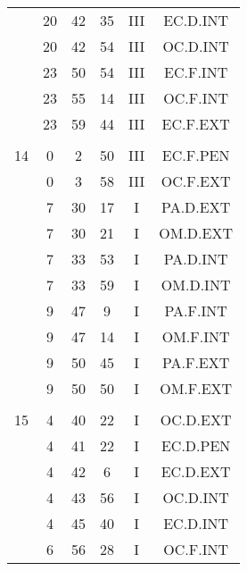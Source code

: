 \documentclass[12pt, a4paper]{article}
\begin{document}
\begin{multicols}{3}
{\begin{tabular}{c c c c c c}
	 	 	 	 & 20 & 42 & 35 & III & EC.D.INT\\%
	 	 	 	 & 20 & 42 & 54 & III & OC.D.INT\\%
	 	 	 	 & 23 & 50 & 54 & III & EC.F.INT\\%
	 	 	 	 & 23 & 55 & 14 & III & OC.F.INT\\%
	 	 	 	 & 23 & 59 & 44 & III & EC.F.EXT\\%
	 	 	 	 & & & & & \\%
	 	 	 	14 & 0 & 2 & 50 & III & EC.F.PEN\\%
	 	 	 	 & 0 & 3 & 58 & III & OC.F.EXT\\%
	 	 	 	 & 7 & 30 & 17 & I & PA.D.EXT\\%
	 	 	 	 & 7 & 30 & 21 & I & OM.D.EXT\\%
	 	 	 	 & 7 & 33 & 53 & I & PA.D.INT\\%
	 	 	 	 & 7 & 33 & 59 & I & OM.D.INT\\%
	 	 	 	 & 9 & 47 & 9 & I & PA.F.INT\\%
	 	 	 	 & 9 & 47 & 14 & I & OM.F.INT\\%
	 	 	 	 & 9 & 50 & 45 & I & PA.F.EXT\\%
	 	 	 	 & 9 & 50 & 50 & I & OM.F.EXT\\%
	 	 	 	 & & & & & \\%
	 	 	 	15 & 4 & 40 & 22 & I & OC.D.EXT\\%
	 	 	 	 & 4 & 41 & 22 & I & EC.D.PEN\\%
	 	 	 	 & 4 & 42 & 6 & I & EC.D.EXT\\%
	 	 	 	 & 4 & 43 & 56 & I & OC.D.INT\\%
	 	 	 	 & 4 & 45 & 40 & I & EC.D.INT\\%
	 	 	 	 & 6 & 56 & 28 & I & OC.F.INT\\%

\end{tabular}}
\end{multicols}
\end{document}
